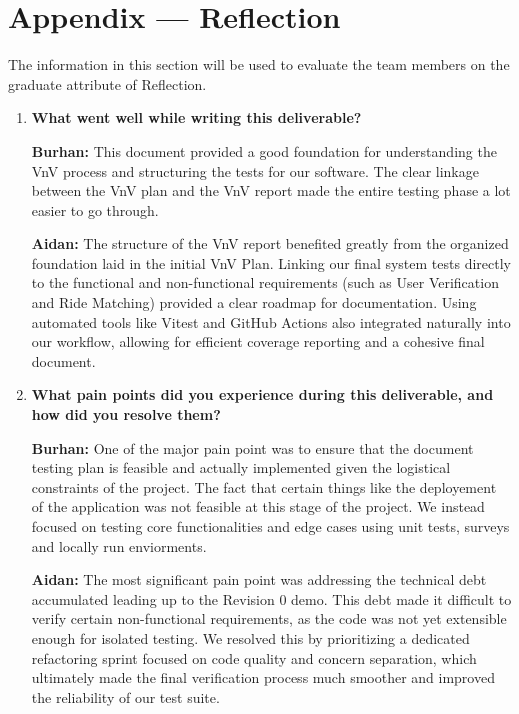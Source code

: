 


\newpage{}
\section*{Appendix --- Reflection}

The information in this section will be used to evaluate the team members on the
graduate attribute of Reflection.



\begin{enumerate}
  \item \textbf{What went well while writing this deliverable?} 
  
  \textbf{Burhan:} This document provided a good foundation for understanding the VnV process and structuring the tests for our software. The clear linkage between the VnV plan and the VnV report made the entire testing phase a lot easier to go through. 

  \textbf{Aidan:} The structure of the VnV report benefited greatly from the organized foundation laid in the initial VnV Plan. Linking our final system tests directly to the functional and non-functional requirements (such as User Verification and Ride Matching) provided a clear roadmap for documentation. Using automated tools like Vitest and GitHub Actions also integrated naturally into our workflow, allowing for efficient coverage reporting and a cohesive final document.

  \item \textbf{What pain points did you experience during this deliverable, and how did you resolve them?}
  
  \textbf{Burhan:} One of the major pain point was to ensure that the document testing plan is feasible and actually implemented given the logistical constraints of the project. The fact that certain things like the deployement of the application was not feasible at this stage of the project. We instead focused on testing core functionalities and edge cases using unit tests, surveys and locally run enviorments. 

  \textbf{Aidan:} The most significant pain point was addressing the technical debt accumulated leading up to the Revision 0 demo. This debt made it difficult to verify certain non-functional requirements, as the code was not yet extensible enough for isolated testing. We resolved this by prioritizing a dedicated refactoring sprint focused on code quality and concern separation, which ultimately made the final verification process much smoother and improved the reliability of our test suite.


\end{enumerate}
